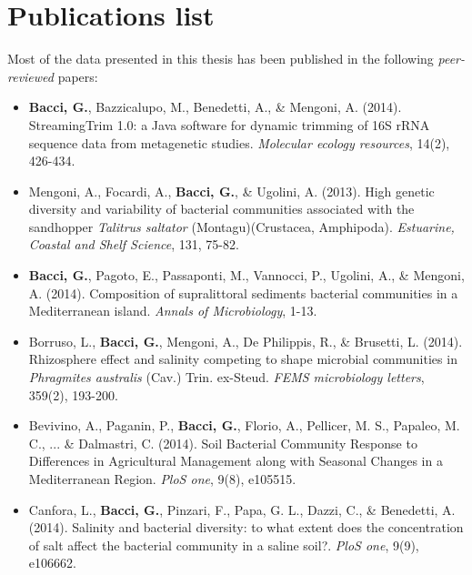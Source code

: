 
\chapter{Publications list}

Most of the data presented in this thesis has been published in the following \textit{peer-reviewed} papers:
\begin{itemize}

\item \textbf{Bacci, G.}, Bazzicalupo, M., Benedetti, A., \& Mengoni, A. (2014). StreamingTrim 1.0: a Java software for dynamic trimming of 16S rRNA sequence data from metagenetic studies. \textit{Molecular ecology resources}, 14(2), 426-434.

\item Mengoni, A., Focardi, A., \textbf{Bacci, G.}, \& Ugolini, A. (2013). High genetic diversity and variability of bacterial communities associated with the sandhopper \textit{Talitrus saltator} (Montagu)(Crustacea, Amphipoda). \textit{Estuarine, Coastal and Shelf Science}, 131, 75-82.

\item \textbf{Bacci, G.}, Pagoto, E., Passaponti, M., Vannocci, P., Ugolini, A., \& Mengoni, A. (2014). Composition of supralittoral sediments bacterial communities in a Mediterranean island. \textit{Annals of Microbiology}, 1-13.

\item Borruso, L., \textbf{Bacci, G.}, Mengoni, A., De Philippis, R., \& Brusetti, L. (2014). Rhizosphere effect and salinity competing to shape microbial communities in \textit{Phragmites australis} (Cav.) Trin. ex-Steud. \textit{FEMS microbiology letters}, 359(2), 193-200.

\item Bevivino, A., Paganin, P., \textbf{Bacci, G.}, Florio, A., Pellicer, M. S., Papaleo, M. C., ... \& Dalmastri, C. (2014). Soil Bacterial Community Response to Differences in Agricultural Management along with Seasonal Changes in a Mediterranean Region. \textit{PloS one}, 9(8), e105515.

\item Canfora, L., \textbf{Bacci, G.}, Pinzari, F., Papa, G. L., Dazzi, C., \& Benedetti, A. (2014). Salinity and bacterial diversity: to what extent does the concentration of salt affect the bacterial community in a saline soil?. \textit{PloS one}, 9(9), e106662.

\end{itemize}

